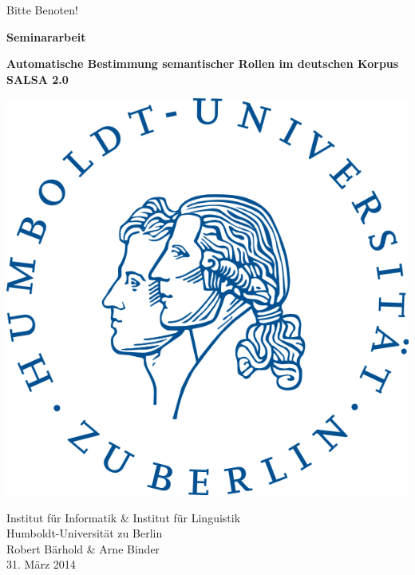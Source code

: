 \documentclass[12pt]{article}
\begin{document}
\thispagestyle{empty} 


\begin{center}
	\vspace*{\fill}
	Bitte Benoten!
	\vspace*{\fill}


	\newpage
	\vspace*{\fill}
	
	\Huge{\textbf{Seminararbeit}}\\
	\vspace{1.5cm}
	
	\Large{\textbf{Automatische Bestimmung semantischer Rollen im deutschen
	Korpus SALSA 2.0}}\\
	\vspace{1cm}
		
	\includegraphics[scale=0.3]{images/logo_hu.png}
	\vspace{1cm}

	\begin{Large}
		Institut für Informatik \& Institut für Linguistik\\
		Humboldt-Universität zu Berlin\\
		\vspace{1.5cm}
		Robert Bärhold \& Arne Binder \\
		31. März 2014 \\ %
		\vspace{1cm}
		

\end{Large}
\end{center}
\end{document}
